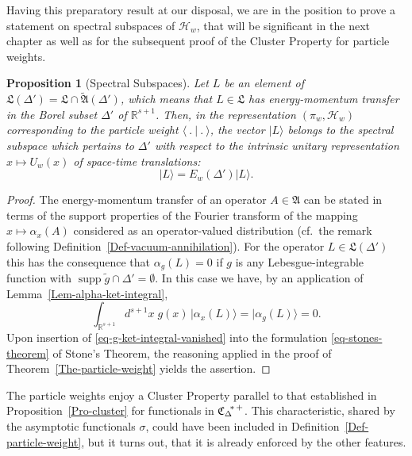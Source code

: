 \documentclass[11pt,twoside,openright]{report}
\theoremstyle{definition}
\theoremstyle{plain}
\newtheorem{Pro}[Def]{Proposition}
\theoremstyle{remark}
\theoremstyle{assumption}
\DeclareMathOperator{\supp}{supp}
\newcommand{\ket}[1]{\vert #1 \rangle}
\newcommand{\bket}[1]{\big\vert #1 \bigr\rangle}
\newcommand{\scp}[2]{\langle #1 \vert #2 \rangle}
\newcommand{\Afrak}{\mathfrak{A}}
\newcommand{\Lfrak}{\mathfrak{L}}
\newcommand{\Hscr}{\mathscr{H}}
\newcommand{\Rsone}{\mathbb{R}^{s + 1}}
\newcommand{\EwDprime}{E_w ( \Delta' )}
\newcommand{\CDstarplus}{{\mathfrak{C}_\Delta}^{\negthickspace *
    \thinspace +}}
\newcommand{\ax}{\alpha_x}
\begin{document}
Having this preparatory result at our disposal, we are in the position
to prove a statement on spectral subspaces of $\Hscr_w$, that will be
significant in the next chapter as well as for the subsequent proof of
the Cluster Property for particle weights.
\begin{Pro}[Spectral Subspaces]
  \label{Pro-spectral-subspace}
  Let $L$ be an element of $\Lfrak ( \Delta' ) = \Lfrak \cap
  \widetilde{\Afrak} ( \Delta' )$, which means that $L \in \Lfrak$ has
  energy-momentum transfer in the Borel subset $\Delta'$ of $\Rsone$. 
  Then, in the representation $( \pi_w , \Hscr_w )$ corresponding to
  the particle weight $\scp{~.~}{~.~}$, the vector $\ket{L}$ belongs
  to the spectral subspace which pertains to $\Delta'$ with respect to
  the intrinsic unitary representation $x \mapsto U_w ( x )$ of
  space-time translations:
  \begin{equation}
    \label{eq-energy-momentum-subspace}
    \ket{L} = \EwDprime \ket{L} \text{.}
  \end{equation}
\end{Pro}
\begin{proof}
  The energy-momentum transfer of an operator $A \in \Afrak$ can be
  stated in terms of the support properties of the Fourier transform
  of the mapping $x \mapsto \ax ( A )$ considered as an
  operator-valued distribution (cf.~the remark following
  Definition~\ref{Def-vacuum-annihilation}). For the operator $L \in
  \Lfrak ( \Delta' )$ this has the consequence that $\alpha_g ( L ) =
  0$ if $g$ is any Lebesgue-integrable function with $\supp \tilde{g}
  \cap \Delta' = \emptyset$. In this case we have, by an application
  of Lemma~\ref{Lem-alpha-ket-integral},
  \begin{equation}
    \label{eq-g-ket-integral-vanished}
    \int_{\Rsone} d^{s + 1} x \; g ( x ) \, \bket{\ax ( L )} =
    \bket{\alpha_g ( L )} = 0 \text{.}
  \end{equation}
  Upon insertion of \eqref{eq-g-ket-integral-vanished} into the
  formulation \eqref{eq-stones-theorem} of Stone's Theorem, the
  reasoning applied in the proof of Theorem~\ref{The-particle-weight}
  yields the assertion.
\end{proof}
The particle weights enjoy a Cluster Property parallel to that
established in Proposition~\ref{Pro-cluster} for functionals in
$\CDstarplus$. This characteristic, shared by the asymptotic
functionals $\sigma$, could have been included in
Definition~\ref{Def-particle-weight}, but it turns out, that it is
already enforced by the other features.
\end{document}
